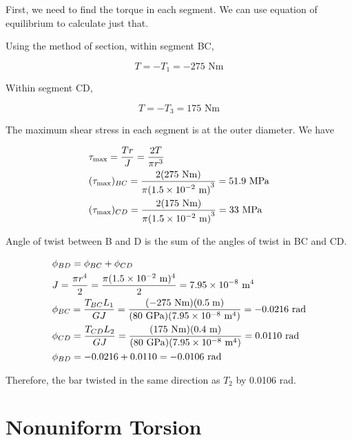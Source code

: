\documentclass[
10pt,
a4paper,
openany,
svgnames,
]{kaobook} %
\begin{document}
\begin{solution}
First, we need to find the torque in each segment. We can use equation of equilibrium to calculate just that.

Using the method of section, within segment BC,

$$T =  - {T_1} =  - 275\text{ Nm}$$

Within segment CD,

\[T =  - {T_3} = 175\text{ Nm}\]

The maximum shear stress in each segment is at the outer diameter. We have

\[\begin{gathered}
  {\tau _{\max }} = \frac{{Tr}}{{{J}}} = \frac{{2T}}{{\pi {r^3}}} \hfill \\
  {({\tau_{\max }})_{BC}} = \frac{{2(275\text{ Nm})}}{{\pi {{(1.5 \times {{10}^{ - 2}}\text{ m})}^3}}} = 51.9\text{ MPa} \hfill \\
  {({\tau _{\max }})_{CD}} = \frac{{2(175\text{ Nm})}}{{\pi {{(1.5 \times {{10}^{ - 2}}\text{ m})}^3}}} = 33\text{ MPa} \hfill \\ 
\end{gathered} \]

Angle of twist between B and D is the sum of the angles of twist in BC and CD.

\[\begin{gathered}
  \phi_{BD} = \phi_{BC} + \phi_{CD} \hfill \\
  J = \frac{\pi r^4}{2} = \frac{\pi (1.5 \times 10^{-2}\text{ m})^4}{2} = 7.95 \times 10^{-8}\text{ m}^4 \hfill \\
  \phi_{BC} = \frac{T_{BC}L_1}{GJ} = \frac{( - 275\text{ Nm})(0.5\;{\text{m}})}{(80\text{ GPa})(7.95 \times 10^{-8}\text{ m}^4)} =  - 0.0216\text{ rad} \hfill \\
  \phi_{CD} = \frac{T_{CD}L_2}{GJ} = \frac{(175\text{ Nm})(0.4\text{ m})}{(80\text{ GPa})(7.95 \times 10^{-8}\text{ m}^4)} = 0.0110\text{ rad} \hfill \\
  \phi_{BD} =  - 0.0216 + 0.0110 =  - 0.0106\text{ rad} \hfill \\ 
\end{gathered} \]

Therefore, the bar twisted in the same direction as $T_2$ by 0.0106 rad.
\end{solution}

\section{Nonuniform Torsion}
\end{document}
